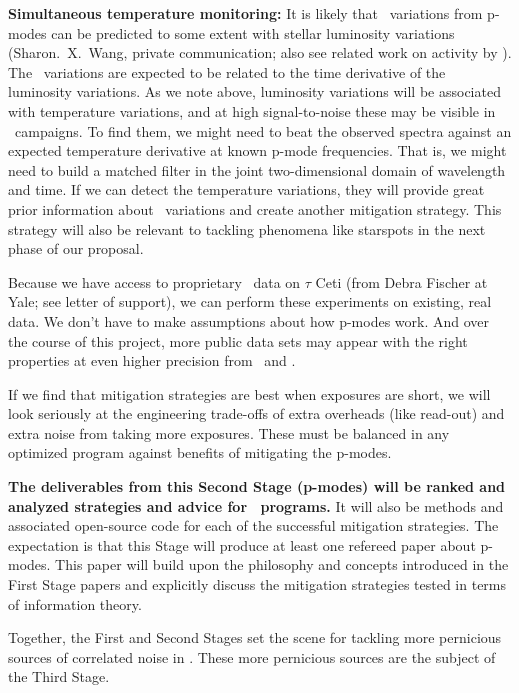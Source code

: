 \documentclass[12pt, letterpaper]{article}
\begin{document}
\begin{itemize}
\textbf{Simultaneous temperature monitoring:}
It is likely that \RV\ variations from p-modes can be predicted
to some extent with stellar luminosity variations
(Sharon.~X.~Wang, private communication; also see related work on activity by \citealt{Aigrain}).
The \RV\ variations are expected to be related to the time derivative of the
luminosity variations.
As we note above, luminosity variations will be associated with
temperature variations, and at high signal-to-noise these may be
visible in \EPRV\ campaigns.
To find them, we might need to beat the observed spectra against an
expected temperature derivative at known p-mode frequencies.
That is, we might need to build a matched filter in the joint
two-dimensional domain of wavelength and time.
If we can detect the temperature variations, they will provide great
prior information about \RV\ variations and create another mitigation
strategy. 
This strategy will also be relevant to tackling phenomena like starspots in
the next phase of our proposal.
\end{itemize}

\noindent
Because we have access to proprietary \EXPRES\ data on $\tau$ Ceti 
(from Debra Fischer at Yale; see letter of support),
we can perform these experiments on existing, real data.
We don't have to make assumptions about how p-modes work.
And over the course of this project, more public data sets may appear
with the right properties at even higher precision from \ESPRESSO\ and \NEID.

If we find that mitigation strategies are best when exposures
are short, we will look seriously at the engineering trade-offs
of extra overheads (like read-out) and extra noise from taking
more exposures. These must be balanced in any optimized program
against benefits of mitigating the p-modes.

\textbf{The deliverables from this Second Stage (p-modes) will be ranked
and analyzed strategies and advice for \EPRV\ programs.} It will
also be methods and associated open-source code for each of the successful
mitigation strategies.
The expectation is that this Stage will produce at least one
refereed paper about p-modes. 
This paper will build upon the philosophy and concepts introduced in the First Stage 
papers and explicitly discuss the mitigation strategies tested in 
terms of information theory.

Together, the First and Second Stages set the scene for tackling more
pernicious sources of correlated noise in \EPRV.
These more pernicious sources are the subject of the Third Stage.
\end{document}
